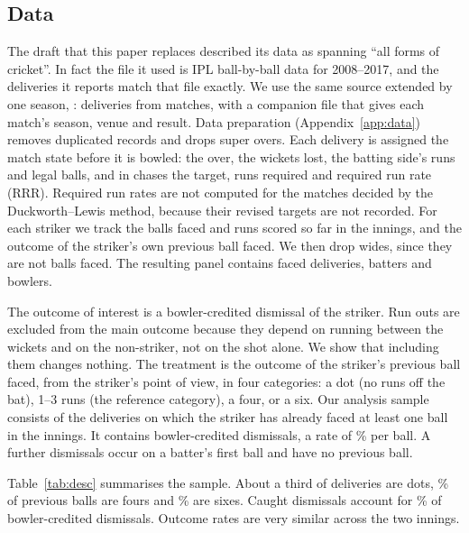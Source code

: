\documentclass[11pt]{article}
\begin{document}
\subsection{Data}

The draft that this paper replaces described its data as spanning ``all forms of cricket''. In fact the file it used is IPL ball-by-ball data for 2008--2017, and the \OrigDeliveries{} deliveries it reports match that file exactly. We use the same source extended by one season, \Seasons{}: \RawDeliveries{} deliveries from \RawMatches{} matches, with a companion file that gives each match's season, venue and result. Data preparation (Appendix~\ref{app:data}) removes \DroppedDuplicates{} duplicated records and drops super overs. Each delivery is assigned the match state before it is bowled: the over, the wickets lost, the batting side's runs and legal balls, and in chases the target, runs required and required run rate (RRR). Required run rates are not computed for the \DLMatches{} matches decided by the Duckworth--Lewis method, because their revised targets are not recorded. For each striker we track the balls faced and runs scored so far in the innings, and the outcome of the striker's own previous ball faced. We then drop wides, since they are not balls faced. The resulting panel contains \FacedDeliveries{} faced deliveries, \Batters{} batters and \Bowlers{} bowlers.

The outcome of interest is a bowler-credited dismissal of the striker. Run outs are excluded from the main outcome because they depend on running between the wickets and on the non-striker, not on the shot alone. We show that including them changes nothing. The treatment is the outcome of the striker's previous ball faced, from the striker's point of view, in four categories: a dot (no runs off the bat), 1--3 runs (the reference category), a four, or a six. Our analysis sample consists of the \AnalysisN{} deliveries on which the striker has already faced at least one ball in the innings. It contains \AnalysisOuts{} bowler-credited dismissals, a rate of \AnalysisOutRate\% per ball. A further \FirstBallOuts{} dismissals occur on a batter's first ball and have no previous ball.

Table~\ref{tab:desc} summarises the sample. About a third of deliveries are dots, \ShareFourPrev\% of previous balls are fours and \ShareSixPrev\% are sixes. Caught dismissals account for \ShareCaught\% of bowler-credited dismissals. Outcome rates are very similar across the two innings.
\end{document}
